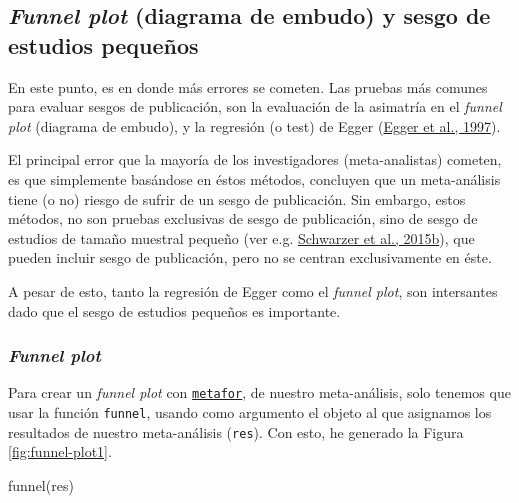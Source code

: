 \documentclass[
  bookmarksnumbered]{article}
\newenvironment{Shaded}{\begin{snugshade}}{\end{snugshade}}
\newcommand{\FunctionTok}[1]{\textcolor[rgb]{0.39,0.29,0.61}{#1}}
\newcommand{\NormalTok}[1]{\textcolor[rgb]{0.12,0.11,0.11}{#1}}
\begin{document}
\hypertarget{funnel-plot-diagrama-de-embudo-y-sesgo-de-estudios-pequeuxf1os}{%
\subsection{\texorpdfstring{\emph{Funnel plot} (diagrama de embudo) y sesgo de estudios pequeños}{Funnel plot (diagrama de embudo) y sesgo de estudios pequeños}}\label{funnel-plot-diagrama-de-embudo-y-sesgo-de-estudios-pequeuxf1os}}

En este punto, es en donde más errores se cometen. Las pruebas más comunes para evaluar sesgos de publicación, son la evaluación de la asimatría en el \emph{funnel plot} (diagrama de embudo), y la regresión (o test) de Egger (\protect\hyperlink{ref-eggerBiasMetaanalysisDetected1997}{Egger et al., 1997}).

El principal error que la mayoría de los investigadores (meta-analistas) cometen, es que simplemente basándose en éstos métodos, concluyen que un meta-análisis tiene (o no) riesgo de sufrir de un sesgo de publicación. Sin embargo, estos métodos, no son pruebas exclusivas de sesgo de publicación, sino de sesgo de estudios de tamaño muestral pequeño (ver e.g. \protect\hyperlink{ref-schwarzerSmallStudyEffectsMetaAnalysis2015}{Schwarzer et al., 2015b}), que pueden incluir sesgo de publicación, pero no se centran exclusivamente en éste.

A pesar de esto, tanto la regresión de Egger como el \emph{funnel plot}, son intersantes dado que el sesgo de estudios pequeños es importante.

\hypertarget{funnel-plot}{%
\subsubsection{\texorpdfstring{\emph{Funnel plot}}{Funnel plot}}\label{funnel-plot}}

Para crear un \emph{funnel plot} con \href{https://www.metafor-project.org/doku.php}{\texttt{metafor}}, de nuestro meta-análisis, solo tenemos que usar la función \texttt{funnel}, usando como argumento el objeto al que asignamos los resultados de nuestro meta-análisis (\texttt{res}). Con esto, he generado la Figura \ref{fig:funnel-plot1}.

\begin{Shaded}
\begin{Highlighting}[]
\FunctionTok{funnel}\NormalTok{(res)}
\end{Highlighting}
\end{Shaded}
\end{document}
